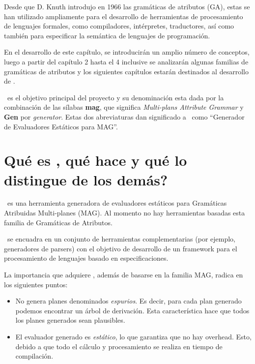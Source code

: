 Desde que D. Knuth introdujo en 1966 las gramáticas de atributos (GA)\cite{Knuth}, estas se han utilizado ampliamente para el desarrollo de herramientas de procesamiento de lenguajes formales, como compiladores, intérpretes, traductores, así  como también para especificar la semántica de lenguajes de programación.

En el desarrollo de este capítulo, se introducirán un amplio número de conceptos, luego a partir del capítulo 2 hasta el 4 inclusive se analizarán algunas familias de gramáticas de atributos y los siguientes capítulos estarán destinados al desarrollo de \maggen. 

\maggen\ es el objetivo principal del proyecto y su denominación esta dada por la combinación de las sílabas \textbf{mag}, que significa \textit{Multi-plans Attribute Grammar} y \textbf{Gen} por \textit{generator}. Estas dos abreviaturas dan significado a \maggen\ como ``Generador de Evaluadores Estáticos para MAG''.

\section{\textquestiondown Qué es \maggen, qué hace y qué lo distingue de los demás?}

\maggen\ es una herramienta generadora de evaluadores estáticos para Gramáticas Atribuidas Multi-planes (MAG). Al momento no hay herramientas basadas esta familia de Gramáticas de Atributos. 

\maggen\ se encuadra en un conjunto de herramientas complementarias (por ejemplo, generadores de parsers) con el objetivo de desarrollo de un framework para el procesamiento de lenguajes basado en especificaciones.

La importancia que adquiere \maggen, además de basarse en la familia MAG, radica en los siguientes puntos: 
\begin{itemize}
 \item No genera planes denominados \textit{espurios}. Es decir, para cada plan generado podemos encontrar un árbol de derivación. Esta característica hace que todos los planes generados sean plausibles.
 \item El evaluador generado es \textit{estático}, lo que garantiza que no hay overhead. Esto, debido a que todo el cálculo y procesamiento se realiza en tiempo de compilación.
\end{itemize}




